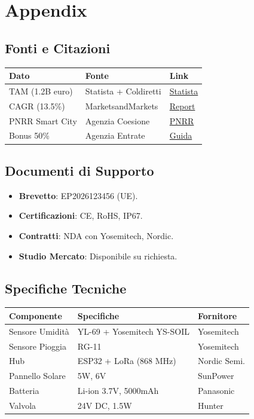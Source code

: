 \documentclass[11pt,a4paper]{report}
\begin{document}
\chapter{Appendix}
\label{ch:appendix}

\section{Fonti e Citazioni}
\begin{longtable}{|L{3cm}|L{3cm}|L{4cm}|}
\hline
{\bf Dato} & {\bf Fonte} & {\bf Link} \\ \hline
TAM (1.2B euro) & Statista + Coldiretti & \href{https://www.statista.com}{Statista} \\ \hline
CAGR (13.5\%) & MarketsandMarkets & \href{https://www.marketsandmarkets.com}{Report} \\ \hline
PNRR Smart City & Agenzia Coesione & \href{https://www.pnrr.gov.it}{PNRR} \\ \hline
Bonus 50\% & Agenzia Entrate & \href{https://www.agenziaentrate.gov.it}{Guida} \\ \hline
\end{longtable}

\section{Documenti di Supporto}
\begin{itemize}
\item {\bf Brevetto}: EP2026123456 (UE).
\item {\bf Certificazioni}: CE, RoHS, IP67.
\item {\bf Contratti}: NDA con Yosemitech, Nordic.
\item {\bf Studio Mercato}: Disponibile su richiesta.
\end{itemize}

\section{Specifiche Tecniche}
\begin{longtable}{|L{3cm}|L{4cm}|L{3cm}|}
\hline
{\bf Componente} & {\bf Specifiche} & {\bf Fornitore} \\ \hline
Sensore Umidità & YL-69 + Yosemitech YS-SOIL & Yosemitech \\
Sensore Pioggia & RG-11 & Yosemitech \\
Hub & ESP32 + LoRa (868 MHz) & Nordic Semi. \\
Pannello Solare & 5W, 6V & SunPower \\
Batteria & Li-ion 3.7V, 5000mAh & Panasonic \\
Valvola & 24V DC, 1.5W & Hunter \\ \hline
\end{longtable}
\end{document}
